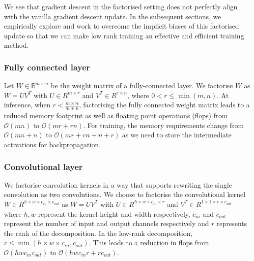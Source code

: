 \documentclass{article}
\begin{document}
We see that gradient descent in the factorised setting does not perfectly align with the vanilla gradient descent update. In the subsequent sections, we empirically explore and work to overcome the implicit biases of this factorised update so that we can make low rank training an effective and efficient training method.


\subsubsection{Fully connected layer}\label{fcfactor}

Let $W \in \mathbb{R}^{m\times n}$ be the weight matrix of a fully-connected layer. We factorise $W$ as $W = UV^T$ with $U \in R^{m\times r}$ and $V^T \in R^{r\times n}$, where $0 < r \leq \min(m, n)$. At inference, when $r< \frac{m\times n}{m+n}$, factorising the fully connected weight matrix leads to a reduced memory footprint as well as floating point operations (flops) from $\mathcal{O}(mn)$ to $\mathcal{O}(mr + rn)$. For training, the memory requirements change from $\mathcal{O}(mn + n)$ to $\mathcal{O}(mr + rn + n+ r)$ as we need to store the intermediate activations for backpropagation.


\subsubsection{Convolutional layer} \label{convfactor}

We factorise convolution kernels in a way that supports rewriting the single convolution as two convolutions. We choose to factorise the convolutional kernel $W \in R^{h \times w \times c_{in} \times c_{out}}$ as $W = UV^T$ with $U \in R^{h \times w \times c_{in} \times r}$ and $V^T \in R^{1 \times 1 \times r \times c_{out}}$ where $h, w$ represent the kernel height and width respectively, $c_{in}$ and $c_{out}$ represent the number of input and output channels respectively and $r$ represents the rank of the decomposition. In the low-rank decomposition, $r \leq \min(h \times w \times c_{in}, c_{out})$. This leads to a reduction in flops from $\mathcal{O}(hwc_{in}c_{out})$ to $\mathcal{O}(hwc_{in}r+rc_{out}).$
\end{document}
